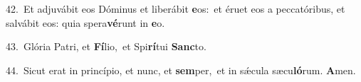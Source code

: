 {\numbfont\textcolor{\numbcolor}{42.}}~Et adjuvábit eos Dóminus et liberábit \textbf{e}\-os:~\star et éruet eos a peccatóribus, et salvábit eos: quia spera\-\textbf{vé}\-runt in \textbf{e}\-o.\par
{\numbfont\textcolor{\numbcolor}{43.}}~Glória Patri, et \textbf{Fí}\-lio,~\star et Spi\-\textbf{rí}\-tui \textbf{Sanc}\-to.\par
{\numbfont\textcolor{\numbcolor}{44.}}~Sicut erat in princípio, et nunc, et \textbf{sem}\-per,~\star et in sǽcula sæcu\-\textbf{ló}\-rum. \textbf{A}\-men.\par
